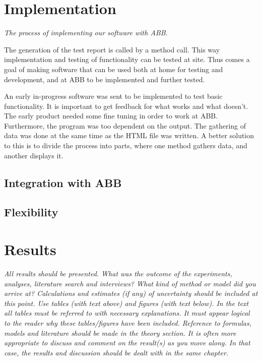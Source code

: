 \documentclass{article}
\begin{document}
	
	
	\section{Implementation} \label{implementation}
	\em The process of implementing our software with ABB. \em
	
	The generation of the test report is called by a method call. This way implementation and testing of functionality can be tested at site. Thus comes a goal of making software that can be used both at home for testing and development, and at ABB to be implemented and further tested. 
	
	An early in-progress software was sent to be implemented to test basic functionality. It is important to get feedback for what works and what doesn't. The early product needed some fine tuning in order to work at ABB. Furthermore, the program was too dependent on the output. The gathering of data was done at the same time as the HTML file was written. A better solution to this is to divide the process into parts, where one method gathers data, and another displays it. 
	\subsection{Integration with ABB}
	\subsection{Flexibility}
	
	\pagebreak
	
	\section{Results} \label{results}
	\em All results should be presented. What was the outcome of the experiments, analyses,
	literature search and interviews? What kind of method or model did you arrive at?
	Calculations and estimates (if any) of uncertainty should be included at this point. Use tables
	(with text above) and figures (with text below). In the text all tables must be referred to with
	necessary explanations. It must appear logical to the reader why these tables/figures have
	been included. Reference to formulas, models and literature should be made in the theory
	section. It is often more appropriate to discuss and comment on the result(s) as you move
	along. In that case, the results and discussion should be dealt with in the same chapter.  \em
	\pagebreak
	
\end{document}
